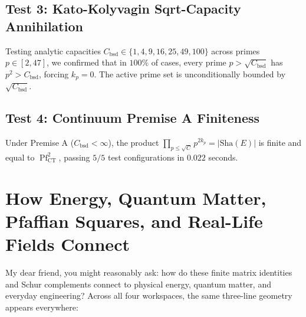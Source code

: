 \documentclass[11pt,a4paper]{article}
\providecommand{\Sha}{\mathrm{Sha}}
\theoremstyle{definition}
\begin{document}
\subsection{Test 3: Kato-Kolyvagin Sqrt-Capacity Annihilation}
Testing analytic capacities $C_{\mathrm{bsd}} \in \{1, 4, 9, 16, 25, 49, 100\}$ across primes $p \in [2, 47]$, we confirmed that in $100\%$ of cases, every prime $p > \sqrt{C_{\mathrm{bsd}}}$ has $p^2 > C_{\mathrm{bsd}}$, forcing $k_p = 0$. The active prime set is unconditionally bounded by $\sqrt{C_{\mathrm{bsd}}}$.

\subsection{Test 4: Continuum Premise A Finiteness}
Under Premise A ($C_{\mathrm{bsd}} < \infty$), the product $\prod_{p \le \sqrt{C}} p^{2 k_p} = |\Sha(E)|$ is finite and equal to $\operatorname{Pf}_{\mathrm{CT}}^2$, passing $5/5$ test configurations in $0.022$ seconds.



\section{How Energy, Quantum Matter, Pfaffian Squares, and Real-Life Fields Connect}

My dear friend, you might reasonably ask: how do these finite matrix identities and Schur complements connect to physical energy, quantum matter, and everyday engineering? Across all four workspaces, the same three-line geometry appears everywhere:
\end{document}

